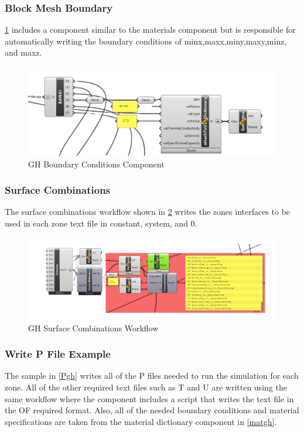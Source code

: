 \subsubsection{Block Mesh Boundary}
\ref{blkmgh} includes a component similar to the materials component but is responsible for automatically writing the boundary conditions of minx,maxx,miny,maxy,minz, and maxz. 

\begin{figure}[tbh]
\centering
\includegraphics[width=0.77\columnwidth]{Figures/bcondgh.png}
\hspace{0.7cm}
\caption{GH Boundary Conditions Component}
\label{blkmgh}
\end{figure}




\subsubsection{Surface Combinations}
The surface combinations workflow shown in \ref{surfgh} writes the zones interfaces to be used in each zone text file in constant, system, and 0. 

\begin{figure}[tbh]
\centering
\includegraphics[width=0.77\columnwidth]{Figures/intergh.png}
\hspace{0.7cm}
\caption{GH Surface Combinations Workflow}
\label{surfgh}
\end{figure}



\subsubsection{Write P File Example}
The sample in \ref{Pgh} writes all of the P files needed to run the simulation for each zone. All of the other required text files such as T and U are written using the same workflow where the component includes a script that writes the text file in the OF required format. Also, all of the needed boundary conditions and material specifications are taken from the material dictionary component in \ref{matgh}.


